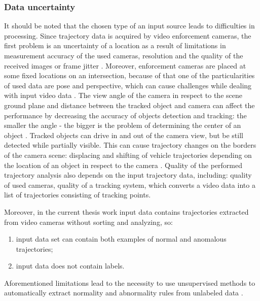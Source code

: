 \subsubsection{Data uncertainty}

It should be noted that the chosen type of an input source leads to difficulties in processing. Since trajectory data is acquired by video enforcement cameras, the first problem is an uncertainty of a location as a result of limitations in measurement accuracy of the used cameras, resolution and the quality of the received images or frame jitter \cite{article:4_detect_eatp}. Moreover, enforcement cameras are placed at some fixed locations on an intersection, because of that one of the particularities of used data are pose and perspective, which can cause challenges while dealing with input video data \cite{article:6_survey_anom_det_rtuvs}. The view angle of the camera in respect to the scene ground plane and distance between the tracked object and camera can affect the performance by decreasing the accuracy of objects detection and tracking: the smaller the angle - the bigger is the problem of determining the center of an object \cite{article:9_trb_vc_aev_sc}\cite{article:4_detect_eatp}. Tracked objects can drive in and out of the camera view, but be still detected while partially visible. This can cause trajectory changes on the borders of the camera scene: displacing and shifting of vehicle trajectories depending on the location of an object in respect to the camera \cite{article:4_detect_eatp}. Quality of the performed trajectory analysis also depends on the input trajectory data, including: quality of used cameras, quality of a tracking system, which converts a video data into a list of trajectories consisting of tracking points.

Moreover, in the current thesis work input data contains trajectories extracted from video cameras without sorting and analyzing, so:

\begin{enumerate}
	\setlength\itemsep{0em}
	\item input data set can contain both examples of normal and anomalous trajectories;
	\item input data does not contain labels.
\end{enumerate}

Aforementioned limitations lead to the necessity to use unsupervised methods to automatically extract normality and abnormality rules from unlabeled data \cite{article:27_vna_cad_td}.
